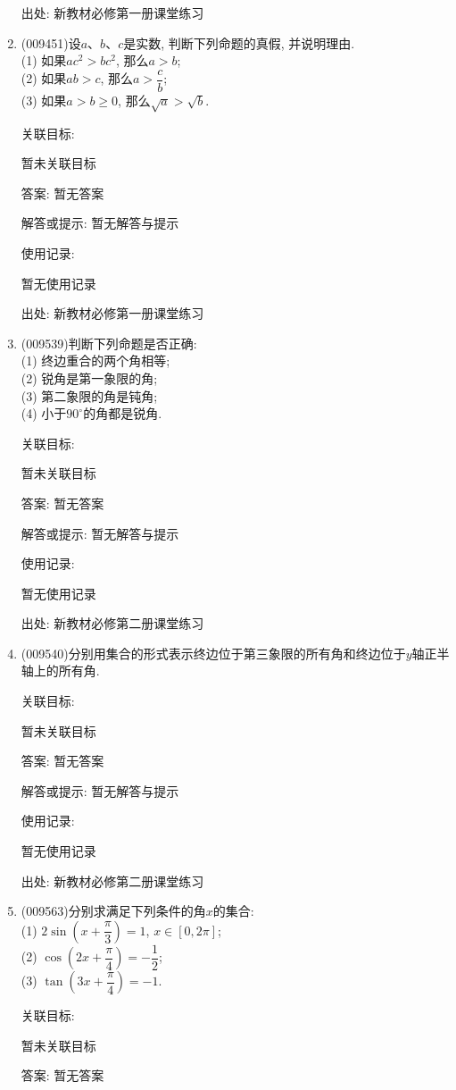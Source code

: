 \documentclass[10pt,a4paper]{article}
\begin{document}
\begin{enumerate}[1.]
出处: 新教材必修第一册课堂练习
\item { (009451)}设$a$、$b$、$c$是实数, 判断下列命题的真假, 并说明理由.\\
(1) 如果$ac^2>bc^2$, 那么$a>b$;\\
(2) 如果$ab>c$, 那么$a>\dfrac cb$;\\
(3) 如果$a>b\ge 0$, 那么$\sqrt a>\sqrt b$.


关联目标:

暂未关联目标

答案: 暂无答案

解答或提示: 暂无解答与提示

使用记录:

暂无使用记录


出处: 新教材必修第一册课堂练习
\item { (009539)}判断下列命题是否正确:\\
(1) 终边重合的两个角相等;\\
(2) 锐角是第一象限的角;\\
(3) 第二象限的角是钝角;\\
(4) 小于$90^\circ$的角都是锐角.


关联目标:

暂未关联目标

答案: 暂无答案

解答或提示: 暂无解答与提示

使用记录:

暂无使用记录


出处: 新教材必修第二册课堂练习
\item { (009540)}分别用集合的形式表示终边位于第三象限的所有角和终边位于$y$轴正半轴上的所有角.


关联目标:

暂未关联目标

答案: 暂无答案

解答或提示: 暂无解答与提示

使用记录:

暂无使用记录


出处: 新教材必修第二册课堂练习
\item { (009563)}分别求满足下列条件的角$x$的集合:\\
(1) $2\sin (x+\dfrac\pi 3)=1$, $x\in [0, 2\pi ]$;\\
(2) $\cos (2x+\dfrac \pi 4)=-\dfrac 12$;\\
(3) $\tan (3x+\dfrac \pi 4)=-1$.


关联目标:

暂未关联目标

答案: 暂无答案


\end{enumerate}
\end{document}
